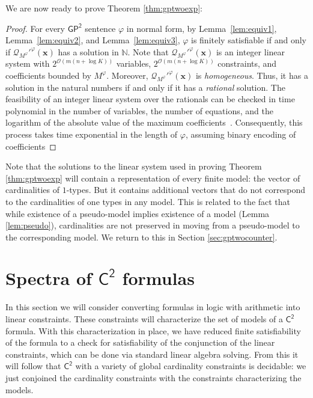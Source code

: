 \documentclass[10pt,a4paper]{article}
\theoremstyle{definition}
\theoremstyle{remark}
\newcommand{\cO}{\mathcal{O}}
\newcommand{\cQ}{\mathcal{Q}}
\newcommand{\bbN}{\mathbb{N}}
\newcommand{\bfx}{\mathbf{x}}
\newcommand{\Ctwo}    {\mathsf{C^2}}
\newcommand{\GPtwo}   {\mathsf{GP^2}}
\newcommand{\bigO}[1] {{\cO\left( #1 \right)}}
\begin{document}
We are now ready to prove Theorem \ref{thm:gptwoexp}:

\begin{proof}
    For every $\GPtwo$ sentence $\varphi$ in normal form,
    by Lemma~\ref{lem:equiv1}, Lemma~\ref{lem:equiv2}, and Lemma~\ref{lem:equiv3},
    $\varphi$ is finitely satisfiable if and only if $\cQ_{M^\varphi}'^\varphi(\bfx)$ has a solution in $\bbN$.
    Note that $\cQ_{M^\varphi}'^\varphi(\bfx)$ is an integer linear system with 
    $2^\bigO{m\left(n + \log K\right)}$ variables, 
    $2^\bigO{m\left(n + \log K\right)}$ constraints, and
    coefficients bounded by $M^\varphi$.
    Moreover, $\cQ_{M^\varphi}'^\varphi(\bfx)$ is \emph{homogeneous}. 
    Thus, it has a solution in the natural numbers if and only if it has a \emph{rational} solution.
    The feasibility of an integer linear system over the rationals can be checked in time polynomial in the number of variables, the number of equations, and the logarithm of the absolute value of the maximum coefficients~\cite{IP}. Consequently, this process takes time exponential in the length of $\varphi$, assuming binary encoding of coefficients
\end{proof}

Note that the solutions to the linear system used in proving Theorem \ref{thm:gptwoexp} will contain a representation of every finite model:  the vector of cardinalities of $1$-types. But it contains additional vectors that do not correspond to the cardinalities of one types in any model. This is related to the fact that while existence of a pseudo-model implies existence of a model (Lemma \ref{lem:pseudo}), cardinalities are not preserved in moving from a pseudo-model to the corresponding model.  We return to this in Section \ref{sec:gptwocounter}. 


\section{Spectra of $\Ctwo$ formulas} \label{sec:ctwo}



In this section we will consider converting formulas in logic with arithmetic into linear constraints. These constraints will characterize  the set of models of a $\Ctwo$ formula. With this characterization in place, we have reduced finite satisfiability of the formula to a check for satisfiability of the conjunction of the linear constraints, which can be done via standard linear algebra solving. From this it will follow that $\Ctwo$ with a variety of global cardinality constraints is decidable: we just conjoined the cardinality constraints with the constraints characterizing the models.
\end{document}
